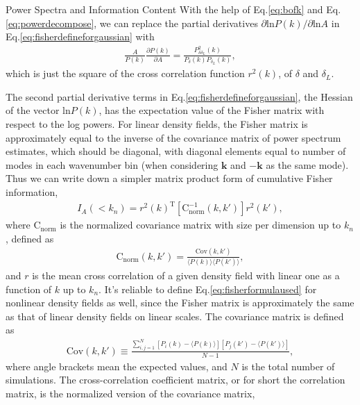 \begin{section}{Power Spectra and Information Content}
   With the help of Eq.\ref{eq:bofk} and Eq.\ref{eq:powerdecompose}, we can replace the partial derivatives 
$\partial \mathrm{ln} P(k) / \partial \mathrm{ln} A$ in Eq.\ref{eq:fisherdefineforgaussian} with 
\begin{align}
   \frac{A}{P(k)}\frac{\partial P(k)}{\partial A}=\frac{P_{\delta \delta_L}^2(k)}{P_\delta(k) P_{\delta_L}(k)},
\end{align}
which is just the square of the 
cross correlation function $r ^2 (k)$, of $\delta$ and $\delta_L$. 

The second partial derivative terms in 
Eq.\ref{eq:fisherdefineforgaussian}, the Hessian of the vector $\mathrm{ln} P(k)$, has the expectation 
value of the Fisher matrix with respect to the log powers. For linear density fields, the Fisher matrix is 
approximately equal to the inverse of the covariance matrix of power spectrum estimates, which should be diagonal, 
with diagonal elements equal to number of modes in each wavenumber bin (when considering $\bm{k}$ and $-\bm{k}$ 
as the same mode). Thus we can write down a simpler matrix product form of cumulative Fisher information, 
\begin{align}
    I_A \left( < k_n\right) = r^2(k)^{\mathrm{T}} \left[ \mathrm{C^{-1}_{norm}} ( k,k' )\right] r^2(k') ,
\label{eq:fisherformulaused}
\end{align}
where $\mathrm{C_{norm}}$ is the normalized covariance matrix with size per dimension up to $k_n$, defined as
\begin{align}
    \mathrm{C_{norm}} \left( k,k' \right)=\frac{\mathrm{Cov}(k,k')}{\langle P(k)\rangle\langle P(k')\rangle},
\end{align}
and $r$ is the mean cross correlation of a given density field with linear one as a function of $k$ up to $k_n$. 
It's reliable to define Eq.\ref{eq:fisherformulaused} for nonlinear density fields as well, 
since the Fisher matrix is approximately the same as that of linear density fields on linear scales. 
The covariance matrix is defined as 
\begin{align}
    \mathrm{Cov}\left(k,k'\right)\equiv \frac{\sum_{i,j=1}^{N}\left[ P_i \left( k \right) - 
\langle P \left( k \right) \rangle \right]\left[ P_j \left( k' \right) - \langle P \left( k' \right)\rangle \right]}{N-1},
\end{align}
where angle brackets mean the expected values, and $N$ is the total number of simulations.
    The  cross-correlation coefficient matrix, or for short the correlation matrix, is the normalized version of the covariance matrix,

\end{section}
